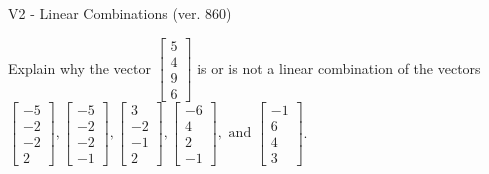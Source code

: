 \begin{exercise}
  \begin{exerciseTitle}V2 - Linear Combinations (ver. 860)\end{exerciseTitle}
  \begin{exerciseStatement}
    Explain why the vector \(\left[\begin{array}{c}
5 \\
4 \\
9 \\
6
\end{array}\right]\)  is or is not a linear 
	combination of the vectors \(\left[\begin{array}{c}
-5 \\
-2 \\
-2 \\
2
\end{array}\right] , \left[\begin{array}{c}
-5 \\
-2 \\
-2 \\
-1
\end{array}\right] , \left[\begin{array}{c}
3 \\
-2 \\
-1 \\
2
\end{array}\right] , \left[\begin{array}{c}
-6 \\
4 \\
2 \\
-1
\end{array}\right] , \text{ and } \left[\begin{array}{c}
-1 \\
6 \\
4 \\
3
\end{array}\right]\).
	



\end{exerciseStatement}
\end{exercise}

